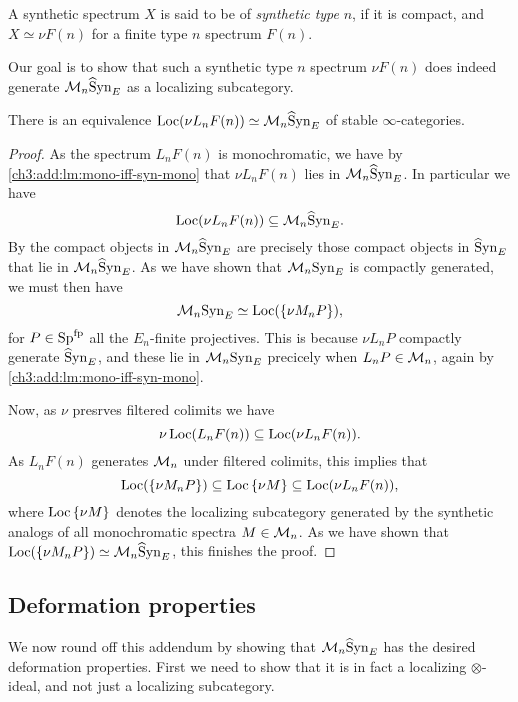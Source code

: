 \begin{definition}
    A synthetic spectrum $X$ is said to be of \emph{synthetic type} $n$, if it is compact, and $X\simeq \nu F(n)$ for a finite type $n$ spectrum $F(n)$. 
\end{definition}

Our goal is to show that such a synthetic type $n$ spectrum $\nu F(n)$ does indeed generate $\mathcal{M}_{n} \widehat{\mathrm{S}}\mathrm{yn}_{E}$ as a localizing subcategory. 

\begin{lemma}
    \label{ch3:add:monochromatic-synthetic-is-gen-by-type-n}
    There is an equivalence $\operatorname{Loc}(\nu L_n F(n))\simeq \mathcal{M}_{n}\widehat{\mathrm{S}}\mathrm{yn}_{E}$ of stable $\infty$-categories. 
\end{lemma}
\begin{proof}
    As the spectrum $L_n F(n)$ is monochromatic, we have by \cref{ch3:add:lm:mono-iff-syn-mono} that $\nu L_n F(n)$ lies in $\mathcal{M}_{n}\widehat{\mathrm{S}}\mathrm{yn}_{E}$. In particular we have 
    \[\operatorname{Loc}(\nu L_n F(n))\subseteq \mathcal{M}_{n}\widehat{\mathrm{S}}\mathrm{yn}_{E}.\]
    By \cite[2.2]{neeman_1992} the compact objects in $\mathcal{M}_{n}\widehat{\mathrm{S}}\mathrm{yn}_{E}$ are precisely those compact objects in $\widehat{\mathrm{S}}\mathrm{yn}_{E}$ that lie in $\mathcal{M}_{n}\widehat{\mathrm{S}}\mathrm{yn}_{E}$. As we have shown that $\mathcal{M}_{n}\mathrm{Syn}_{E}$ is compactly generated, we must then have 
    \[\mathcal{M}_{n}\mathrm{Syn}_{E} \simeq \operatorname{Loc}(\{\nu M_n P\}),\]
    for $P \in \mathrm{Sp}^{\mathrm{fp}}$ all the $E_n$-finite projectives. This is because $\nu L_n P$ compactly generate $\widehat{\mathrm{S}}\mathrm{yn}_{E}$, and these lie in $\mathcal{M}_{n}\mathrm{Syn}_{E}$ precicely when $L_n P\in \mathcal{M}_{n}$, again by \cref{ch3:add:lm:mono-iff-syn-mono}. 

    Now, as $\nu$ presrves filtered colimits we have 
    \[\nu \operatorname{Loc}(L_n F(n))\subseteq \operatorname{Loc}(\nu L_n F(n)).\]
    As $L_n F(n)$ generates $\mathcal{M}_{n}$ under filtered colimits, this implies that 
    \[\operatorname{Loc}(\{\nu M_n P\})\subseteq \operatorname{Loc}{\{\nu M\}} \subseteq \operatorname{Loc}(\nu L_n F(n)),\]
    where $\operatorname{Loc}{\{\nu M\}}$ denotes the localizing subcategory generated by the synthetic analogs of all monochromatic spectra $M\in \mathcal{M}_{n}$. As we have shown that $\operatorname{Loc}(\{\nu M_n P\})\simeq \mathcal{M}_{n}\widehat{\mathrm{S}}\mathrm{yn}_{E}$, this finishes the proof. 
\end{proof}



\subsection{Deformation properties}

We now round off this addendum by showing that $\mathcal{M}_{n}\widehat{\mathrm{S}}\mathrm{yn}_{E}$ has the desired deformation properties. First we need to show that it is in fact a localizing $\otimes$-ideal, and not just a localizing subcategory. 

